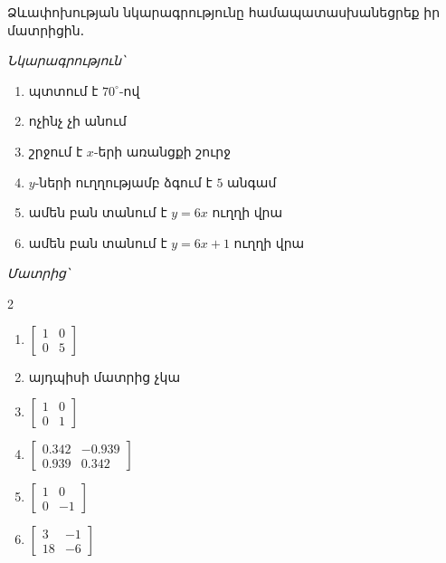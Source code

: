 \begin{problem}
Ձևափոխության նկարագրությունը համապատասխանեցրեք իր մատրիցին․ 

\textit{Նկարագրություն՝} 

\begin{enumerate}[label={\alph*}․]
\item պտտում է $70^\circ$-ով
\item ոչինչ չի անում
\item շրջում է $x$-երի առանցքի շուրջ
\item $y$-ների ուղղությամբ ձգում է $5$ անգամ
\item ամեն բան տանում է $y=6x$ ուղղի վրա
\item ամեն բան տանում է $y=6x+1$ ուղղի վրա
\end{enumerate}

\setlength{\columnseprule}{0pt}

\textit{Մատրից՝} 
\begin{multicols}{2}
\begin{enumerate}
\item $\begin{bmatrix}
    1&0\\0&5
\end{bmatrix}$\vfill
\item այդպիսի մատրից չկա\vfill
\item $\begin{bmatrix}
    1&0\\0&1
\end{bmatrix}$
\item $\begin{bmatrix}
    0.342 & -0.939\\
     0.939& 0.342
\end{bmatrix}$
\item $\begin{bmatrix}
    1&0\\0&-1
\end{bmatrix}$
\item $\begin{bmatrix}
    3&-1\\18&-6
\end{bmatrix}$
\end{enumerate}
\end{multicols}


\end{problem}

